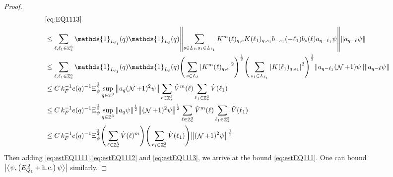 \documentclass[sn-mathphys, Numbered ,a4paper]{sn-jnl}%
\DeclareMathOperator{\Z}{\mathbb{Z}}
\DeclareMathOperator{\NN}{\mathcal{N}}
\newcommand{\half}{\frac{1}{2}}
\newcommand{\eva}[1]{\left\langle #1 \right\rangle}
\theoremstyle{plain}
\theoremstyle{definition}
\theoremstyle{remark}
\theoremstyle{plain}
\theoremstyle{definition}
\theoremstyle{remark}
\begin{document}
\begin{proof}
\begin{comment}
		&\leq  C \,\Xi^\half \left(\sum\limits_{\ell \in \Z^3_*} \norm{K^m(\ell)}_{\mathrm{max,2}}\right)\Bigg(\sum\limits_{\ell_1 \in \Z^3_*} \norm{K(\ell_1)}_{\mathrm{max,2}}^2 \Bigg)^\half \sup_{q \in \Z^3}\norm{ a_{q} \psi}^\half \norm{ \NN^{\frac{3}{2}}\psi}^\half \nonumber\\
		&\leq  C \,\Xi^{\frac{3}{4}} \left(\sum\limits_{\ell \in \Z^3_*} \norm{K^m(\ell)}_{\mathrm{max,2}}\right)\Bigg(\sum\limits_{\ell_1 \in \Z^3_*} \norm{K(\ell_1)}_{\mathrm{max,2}}^2 \Bigg)^\half  \norm{ \NN^{\frac{3}{2}}\psi}^\half \label{eq:estEQ1113}
	\end{align}
\end{comment}
\begin{align}
	&\eqref{eq:EQ1113}\nonumber\\
	&\leq\sum\limits_{\ell, \ell_1\in \Z^3_*} \mathds{1}_{L_{\ell_1}}(q) \mathds{1}_{L_{\ell}}(q)  \norm{ \sum\limits_{s\in L_{\ell}, s_1 \in L_{\ell_1}} K^m(\ell)_{q,s}K(\ell_1)_{q,s_1} b_{-s_1}(-\ell_1) b_{s}(\ell) a_{q-\ell_1}\psi}\norm{ a_{q-\ell}\psi }\nonumber\\
	&\leq\sum\limits_{\ell, \ell_1\in \Z^3_*} \mathds{1}_{L_{\ell_1}}(q) \mathds{1}_{L_{\ell}}(q) \Bigg(\sum\limits_{s \in L_{\ell}} \abs{K^m(\ell)_{q,s}}^2\Bigg)^\half \Bigg(\sum\limits_{s_1 \in L_{\ell_1}} \abs{K(\ell_1)_{q,s_1}}^2\Bigg)^\half \norm{ a_{q-\ell_1} (\NN+1)\psi} \norm{ a_{q-\ell}\psi }\nonumber\\
	&\leq C\, k_F^{-1}e(q)^{-1}\Xi_{\psi}^\half \sup_{q \in \Z^3}\norm{ a_{q} (\NN+1)^2\psi}\sum\limits_{\ell \in \Z^3_*} \hat{V}^{m}(\ell)  \sum\limits_{\ell_1 \in \Z^3_*} \hat{V}(\ell_1)  \nonumber\\
	&\leq C\, k_F^{-1}e(q)^{-1}\Xi_{\psi}^\half \sup_{q \in \Z^3}\norm{ a_{q} \psi}^\half \norm{ (\NN+1)^2\psi}^\half \sum\limits_{\ell \in \Z^3_*} \hat{V}^{m}(\ell)  \sum\limits_{\ell_1 \in \Z^3_*} \hat{V}(\ell_1)  \nonumber\\
	&\leq C\, k_{F}^{-1}e(q)^{-1}\Xi_{\psi}^{\frac{3}{4}} \Bigg(\sum\limits_{\ell \in \Z^3_*} \hat{V}(\ell)^m\Bigg) \Bigg(\sum\limits_{\ell_1 \in \Z^3_*} \hat{V}(\ell_1) \Bigg)  \norm{ (\NN+1)^2\psi}^\half \label{eq:estEQ1113}
\end{align}
Then adding \eqref{eq:estEQ1111},\eqref{eq:estEQ1112} and \eqref{eq:estEQ1113}, we arrive at the bound \eqref{eq:estEQ111}.  One can bound $\abs{\eva{\psi,\left(E^{\,2}_{Q_1}+\mathrm{h.c.}\right) \psi }}$ similarly.
\end{proof}
\end{document}
